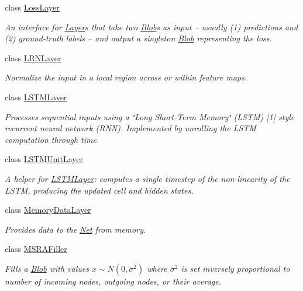 \begin{DoxyCompactItemize}
class \hyperlink{classcaffe_1_1LossLayer}{Loss\+Layer}
\begin{DoxyCompactList}\small\item\em An interface for \hyperlink{classcaffe_1_1Layer}{Layer}s that take two \hyperlink{classcaffe_1_1Blob}{Blob}s as input -- usually (1) predictions and (2) ground-\/truth labels -- and output a singleton \hyperlink{classcaffe_1_1Blob}{Blob} representing the loss. \end{DoxyCompactList}\item 
class \hyperlink{classcaffe_1_1LRNLayer}{L\+R\+N\+Layer}
\begin{DoxyCompactList}\small\item\em Normalize the input in a local region across or within feature maps. \end{DoxyCompactList}\item 
class \hyperlink{classcaffe_1_1LSTMLayer}{L\+S\+T\+M\+Layer}
\begin{DoxyCompactList}\small\item\em Processes sequential inputs using a \char`\"{}\+Long Short-\/\+Term Memory\char`\"{} (L\+S\+TM) \mbox{[}1\mbox{]} style recurrent neural network (R\+NN). Implemented by unrolling the L\+S\+TM computation through time. \end{DoxyCompactList}\item 
class \hyperlink{classcaffe_1_1LSTMUnitLayer}{L\+S\+T\+M\+Unit\+Layer}
\begin{DoxyCompactList}\small\item\em A helper for \hyperlink{classcaffe_1_1LSTMLayer}{L\+S\+T\+M\+Layer}\+: computes a single timestep of the non-\/linearity of the L\+S\+TM, producing the updated cell and hidden states. \end{DoxyCompactList}\item 
class \hyperlink{classcaffe_1_1MemoryDataLayer}{Memory\+Data\+Layer}
\begin{DoxyCompactList}\small\item\em Provides data to the \hyperlink{classcaffe_1_1Net}{Net} from memory. \end{DoxyCompactList}\item 
class \hyperlink{classcaffe_1_1MSRAFiller}{M\+S\+R\+A\+Filler}
\begin{DoxyCompactList}\small\item\em Fills a \hyperlink{classcaffe_1_1Blob}{Blob} with values $ x \sim N(0, \sigma^2) $ where $ \sigma^2 $ is set inversely proportional to number of incoming nodes, outgoing nodes, or their average. \end{DoxyCompactList}\item 

\end{DoxyCompactItemize}
